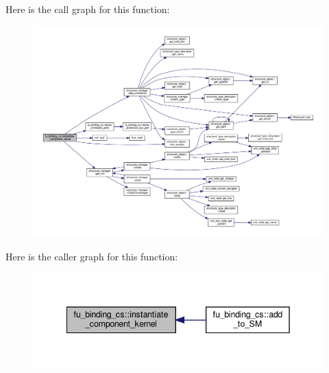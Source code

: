 Here is the call graph for this function\+:
\nopagebreak
\begin{figure}[H]
\begin{center}
\leavevmode
\includegraphics[width=350pt]{d4/d7b/classfu__binding__cs_a02044c5bcc02dfc528c7c3b80c762d4a_cgraph}
\end{center}
\end{figure}
Here is the caller graph for this function\+:
\nopagebreak
\begin{figure}[H]
\begin{center}
\leavevmode
\includegraphics[width=342pt]{d4/d7b/classfu__binding__cs_a02044c5bcc02dfc528c7c3b80c762d4a_icgraph}
\end{center}
\end{figure}
\mbox{\label{classfu__binding__cs_a2c94fa860b8c7ca4d4bac3c107faa957}} 
